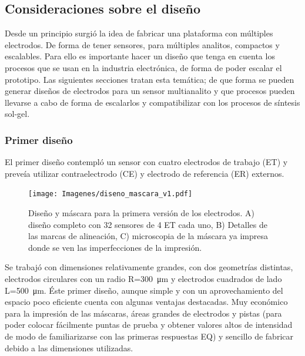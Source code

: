   		\subsection{Consideraciones sobre el diseño}

			 Desde un principio surgió la idea de fabricar una plataforma con múltiples electrodos. De forma de tener sensores, para múltiples analitos, compactos y escalables. Para ello es importante hacer un diseño que tenga en cuenta los procesos que se usan en la industria electrónica, de forma de poder escalar el prototipo. Las siguientes secciones tratan esta temática; de que forma se pueden generar diseños de electrodos para un sensor multianalito y que procesos pueden llevarse a cabo de forma de escalarlos y compatibilizar con los procesos de síntesis sol-gel.

		 \subsubsection{Primer diseño}

		     El primer diseño contempló un sensor con cuatro electrodos de trabajo (ET) y preveía utilizar contraelectrodo (CE) y electrodo de referencia (ER) externos. 

		    	\begin{figure}[th!]
		 	       	\texttt{[image: Imagenes/diseno\_mascara\_v1.pdf]}
 		       		\caption[Primer diseño y máscara de los sensores]{Diseño y máscara para la primera versión de los electrodos. A) diseño completo con 32 sensores de 4 ET cada uno, B) Detalles de las marcas de alineación, C) microscopia de la máscara ya impresa donde se ven las imperfecciones de la impresión.}
 		         	\label{fig:diseno_mascara_v1}
 		     		\end{figure}
 		 	 \pagebreak
 		     		
		      Se trabajó con dimensiones relativamente grandes, con dos geometrías distintas, electrodos circulares con un radio R=\SI{300}{\um} y electrodos cuadrados de lado L=\SI{500}{\um}. Éste primer diseño, aunque simple y con un aprovechamiento del espacio poco eficiente cuenta con algunas ventajas destacadas. Muy económico para la impresión de las máscaras, áreas grandes de electrodos y pistas (para poder colocar fácilmente puntas de prueba y obtener valores altos de intensidad de modo de familiarizarse con las primeras respuestas EQ) y sencillo de fabricar debido a las dimensiones utilizadas.
		

